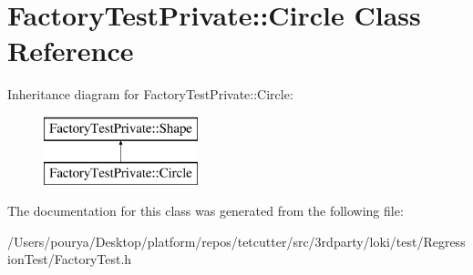 \hypertarget{classFactoryTestPrivate_1_1Circle}{}\section{Factory\+Test\+Private\+:\+:Circle Class Reference}
\label{classFactoryTestPrivate_1_1Circle}
Inheritance diagram for Factory\+Test\+Private\+:\+:Circle\+:\begin{figure}[H]
\begin{center}
\leavevmode
\includegraphics[height=2.000000cm]{classFactoryTestPrivate_1_1Circle}
\end{center}
\end{figure}


The documentation for this class was generated from the following file\+:\begin{DoxyCompactItemize}
\item 
/\+Users/pourya/\+Desktop/platform/repos/tetcutter/src/3rdparty/loki/test/\+Regression\+Test/Factory\+Test.\+h\end{DoxyCompactItemize}
